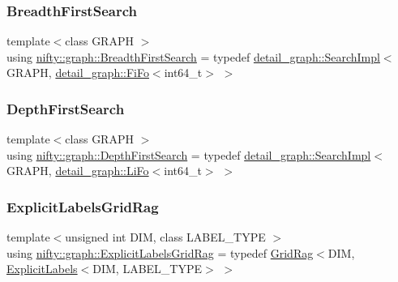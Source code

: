 \subsubsection{\texorpdfstring{Breadth\+First\+Search}{BreadthFirstSearch}}
{\footnotesize\ttfamily template$<$class G\+R\+A\+PH $>$ \\
using \hyperlink{namespacenifty_1_1graph_a5cdea7eb940a178738d5f7ba11b92a15}{nifty\+::graph\+::\+Breadth\+First\+Search} = typedef \hyperlink{classnifty_1_1graph_1_1detail__graph_1_1SearchImpl}{detail\+\_\+graph\+::\+Search\+Impl}$<$G\+R\+A\+PH, \hyperlink{structnifty_1_1graph_1_1detail__graph_1_1FiFo}{detail\+\_\+graph\+::\+Fi\+Fo}$<$int64\+\_\+t$>$ $>$}

\mbox{\label{namespacenifty_1_1graph_a3d6d4a5216a5d0a11785373bc7537085}} 
\subsubsection{\texorpdfstring{Depth\+First\+Search}{DepthFirstSearch}}
{\footnotesize\ttfamily template$<$class G\+R\+A\+PH $>$ \\
using \hyperlink{namespacenifty_1_1graph_a3d6d4a5216a5d0a11785373bc7537085}{nifty\+::graph\+::\+Depth\+First\+Search} = typedef \hyperlink{classnifty_1_1graph_1_1detail__graph_1_1SearchImpl}{detail\+\_\+graph\+::\+Search\+Impl}$<$G\+R\+A\+PH, \hyperlink{structnifty_1_1graph_1_1detail__graph_1_1LiFo}{detail\+\_\+graph\+::\+Li\+Fo}$<$int64\+\_\+t$>$ $>$}

\mbox{\label{namespacenifty_1_1graph_a45cca2dcd061996d13ec8e6bb8afb200}} 
\subsubsection{\texorpdfstring{Explicit\+Labels\+Grid\+Rag}{ExplicitLabelsGridRag}}
{\footnotesize\ttfamily template$<$unsigned int D\+IM, class L\+A\+B\+E\+L\+\_\+\+T\+Y\+PE $>$ \\
using \hyperlink{namespacenifty_1_1graph_a45cca2dcd061996d13ec8e6bb8afb200}{nifty\+::graph\+::\+Explicit\+Labels\+Grid\+Rag} = typedef \hyperlink{classnifty_1_1graph_1_1GridRag}{Grid\+Rag}$<$D\+IM, \hyperlink{classnifty_1_1graph_1_1ExplicitLabels}{Explicit\+Labels}$<$D\+IM, L\+A\+B\+E\+L\+\_\+\+T\+Y\+PE$>$ $>$}

